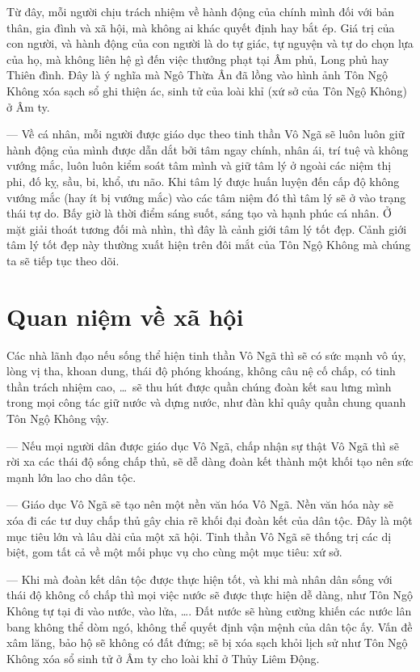 Từ đây, mỗi người chịu trách nhiệm về hành động của chính mình đối với bản thân, gia đình và xã hội, mà không ai khác quyết định hay bắt ép. Giá trị của con người, và hành động của con người là do tự giác, tự nguyện và tự do chọn lựa của họ, mà không liên hệ gì đến việc thưởng phạt tại Âm phủ, Long phủ hay Thiên đình. Đây là ý nghĩa mà Ngô Thừa Ân đã lồng vào hình ảnh Tôn Ngộ Không xóa sạch sổ ghi thiện ác, sinh tử của loài khỉ (xứ sở của Tôn Ngộ Không) ở Âm ty.

— Về cá nhân, mỗi người được giáo dục theo tinh thần Vô Ngã sẽ luôn luôn giữ hành động của mình được dẫn dắt bởi tâm ngay chính, nhân ái, trí tuệ và không vướng mắc, luôn luôn kiểm soát tâm mình và giữ tâm lý ở ngoài các niệm thị phi, đố kỵ, sầu, bi, khổ, ưu não. Khi tâm lý được huấn luyện đến cấp độ không vướng mắc (hay ít bị vướng mắc) vào các tâm niệm đó thì tâm lý sẽ ở vào trạng thái tự do. Bấy giờ là thời điểm sáng suốt, sáng tạo và hạnh phúc cá nhân. Ở mặt giải thoát tương đối mà nhìn, thì đây là cảnh giới tâm lý tốt đẹp. Cảnh giới tâm lý tốt đẹp này thường xuất hiện trên đôi mắt của Tôn Ngộ Không mà chúng ta sẽ tiếp tục theo dõi.


\section{Quan niệm về xã hội} %
\label{sec:3_xa_hoi}

Các nhà lãnh đạo nếu sống thể hiện tinh thần Vô Ngã thì sẽ có sức mạnh vô úy, lòng vị tha, khoan dung, thái độ phóng khoáng, không câu nệ cố chấp, có tinh thần trách nhiệm cao, \ldots ~sẽ thu hút được quần chúng đoàn kết sau lưng mình trong mọi công tác giữ nước và dựng nước, như đàn khỉ quây quần chung quanh Tôn Ngộ Không vậy.

— Nếu mọi người dân được giáo dục Vô Ngã, chấp nhận sự thật Vô Ngã thì sẽ rời xa các thái độ sống chấp thủ, sẽ dễ dàng đoàn kết thành một khối tạo nên sức mạnh lớn lao cho dân tộc.

— Giáo dục Vô Ngã sẽ tạo nên một nền văn hóa Vô Ngã. Nền văn hóa này sẽ xóa đi các tư duy chấp thủ gây chia rẽ khối đại đoàn kết của dân tộc. Đây là một mục tiêu lớn và lâu dài của một xã hội. Tinh thần Vô Ngã sẽ thống trị các dị biệt, gom tất cả về một mối phục vụ cho cùng một mục tiêu: xứ sở.

— Khi mà đoàn kết dân tộc được thực hiện tốt, và khi mà nhân dân sống với thái độ không cố chấp thì mọi việc nước sẽ được thực hiện dễ dàng, như Tôn Ngộ Không tự tại đi vào nước, vào lửa, \ldots. Đất nước sẽ hùng cường khiến các nước lân bang không thể dòm ngó, không thể quyết định vận mệnh của dân tộc ấy. Vấn đề xâm lăng, bảo hộ sẽ không có đất đứng; sẽ bị xóa sạch khỏi lịch sử như Tôn Ngộ Không xóa sổ sinh tử ở Âm ty cho loài khỉ ở Thủy Liêm Động.

